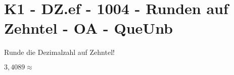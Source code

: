 \section{K1 - DZ.ef - 1004 - Runden auf Zehntel - OA - QueUnb}

\begin{beispiel}{0} %
				Runde die Dezimalzahl auf Zehntel!\leer
					
					$3,4089\approx$ 
\end{beispiel}